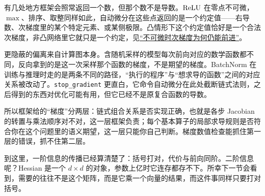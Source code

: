 有几处地方框架会照常返回一个数，但那个数不是导数。\(\operatorname{ReLU}\) 在零点不可微，\(\max\)、排序、取整同样如此，自动微分在这些点返回的是一个约定值——右导数、次梯度里的某个特定元素、或某侧极限。凸情形下这个约定值恰好是一个合法次梯度，非凸网络里它就只是一个约定，见\hyperref[sec:09-Convex-Optimization/06-Optimization-Algorithms/03]{``不可微时次梯度为何仍能前进''}。

更隐蔽的偏离来自计算图本身。含随机采样的模型每次前向对应的数学函数都不同，反向拿到的是这一次采样那个函数的梯度，不是期望的梯度。BatchNorm 在训练与推理时走的是两条不同的路径，``执行的程序''与``想求导的函数''之间的对应关系被改动了。\texttt{stop\_gradient} 更直白，它命令自动微分在此处截断链式法则，之后得到的东西对优化可能有用，但它已经不是原复合函数的导数。

所以框架给的``梯度''分两层：链式组合关系是否实现正确，也就是各步 Jacobian 的转置与乘法顺序对不对，这一层框架负责；每个基本算子的局部求导规则是否符合你在这个问题里的语义期望，这一层只能你自己判断。梯度数值检查能抓住第一层的错误，抓不住第二层。

到这里，一阶信息的传播已经算清楚了：括号打对，代价与前向同阶。二阶信息呢？Hessian 是一个 \(d\times d\) 的对象，参数上亿时它连存都存不下。所幸下一节会看到，需要的往往不是这个矩阵，而是它乘一个向量的结果，而这件事同样只要打对括号。
